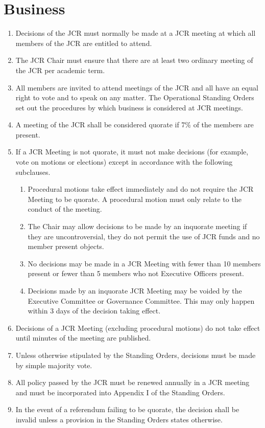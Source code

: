 \documentclass[12pt]{article}
\begin{document}
\newpage

\section{Business}
\begin{enumerate}
    \item Decisions of the JCR must normally be made at a JCR meeting at which all members of the JCR are entitled to attend.
    \item The JCR Chair must ensure that there are at least two ordinary meeting of the JCR per academic term.
    \item All members are invited to attend meetings of the JCR and all have an equal right to vote and to speak on any matter. The Operational Standing Orders set out the procedures by which business is considered at JCR meetings.
    \item A meeting of the JCR shall be considered quorate if 7\% of the members are present.
    \item If a JCR Meeting is not quorate, it must not make decisions (for example, vote on motions or elections) except in accordance with the following subclauses.
    \begin{enumerate}
        \item Procedural motions take effect immediately and do not require the JCR Meeting to be quorate. A procedural motion must only relate to the conduct of the meeting.
        \item The Chair may allow decisions to be made by an inquorate meeting if they are uncontroversial, they do not permit the use of JCR funds and no member present objects.
        \item No decisions may be made in a JCR Meeting with fewer than 10 members present or fewer than 5 members who not Executive Officers present.
        \item Decisions made by an inquorate JCR Meeting may be voided by the Executive Committee or Governance Committee. This may only happen within 3 days of the decision taking effect.
    \end{enumerate}
    \item Decisions of a JCR Meeting (excluding procedural motions) do not take effect until minutes of the meeting are published.
    \item Unless otherwise stipulated by the Standing Orders, decisions must be made by simple majority vote.
    \item All policy passed by the JCR must be renewed annually in a JCR meeting and must be incorporated into Appendix I of the Standing Orders.
    \item In the event of a referendum failing to be quorate, the decision shall be invalid unless a provision in the Standing Orders states otherwise.

\end{enumerate}
\end{document}
